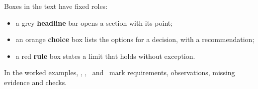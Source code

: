 \begin{center}
\end{center}

Boxes in the text have fixed roles:
\begin{itemize}
  \item a grey \textbf{headline} bar opens a section with its point;
  \item an orange \textbf{choice} box lists the options for a decision, with a recommendation;
  \item a red \textbf{rule} box states a limit that holds without exception.
\end{itemize}
In the worked examples, \contract, \evidence, \gap\ and \review\ mark requirements,
observations, missing evidence and checks.
